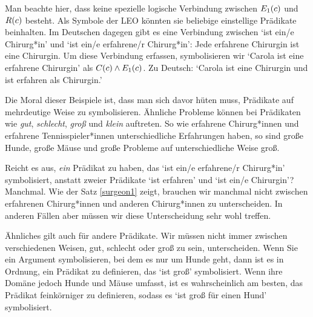 Man beachte hier, dass keine spezielle logische Verbindung zwischen $\mathord{E_1}(c)$ und $\mathord{R}(c)$ besteht. Als Symbole der LEO könnten sie beliebige einstellige Prädikate beinhalten. Im Deutschen dagegen gibt es eine Verbindung zwischen `ist ein/e Chirurg*in' und `ist ein/e erfahrene/r Chirurg*in': Jede erfahrene Chirurgin ist eine Chirurgin. Um diese Verbindung erfassen, symbolisieren wir `Carola ist eine erfahrene Chirurgin' als $\mathord{C}(c) \wedge \mathord{E_1}(c)$. Zu Deutsch: `Carola ist eine Chirurgin und ist erfahren als Chirurgin.'

Die Moral dieser Beispiele ist, dass man sich davor hüten muss, Prädikate auf mehrdeutige Weise zu symbolisieren. Ähnliche Probleme können bei Prädikaten wie \emph{gut}, \emph{schlecht}, \emph{gro{\ss}} und \emph{klein} auftreten. So wie erfahrene Chirurg*innen und erfahrene Tennisspieler*innen unterschiedliche Erfahrungen haben, so sind gro{\ss}e Hunde, gro{\ss}e Mäuse und gro{\ss}e Probleme auf unterschiedliche Weise gro{\ss}.

Reicht es aus, \emph{ein} Prädikat zu haben, das `ist ein/e erfahrene/r Chirurg*in' symbolisiert, anstatt zweier Prädikate `ist erfahren' und `ist ein/e Chirurgin'? Manchmal. Wie der Satz \ref{surgeon1} zeigt, brauchen wir manchmal nicht zwischen erfahrenen Chirurg*innen und anderen Chirurg*innen zu unterscheiden. In anderen Fällen aber müssen wir diese Unterscheidung sehr wohl treffen. 

Ähnliches gilt auch für andere Prädikate. Wir müssen nicht immer zwischen verschiedenen Weisen, gut, schlecht oder gro{\ss} zu sein, unterscheiden. Wenn Sie ein Argument symbolisieren, bei dem es nur um Hunde geht, dann ist es in Ordnung, ein Prädikat zu definieren, das `ist gro{\ss}' symbolisiert. Wenn ihre Domäne jedoch Hunde und Mäuse umfasst, ist es wahrscheinlich am besten, das Prädikat feinkörniger zu definieren, sodass es `ist gro{\ss} für einen Hund' symbolisiert.

